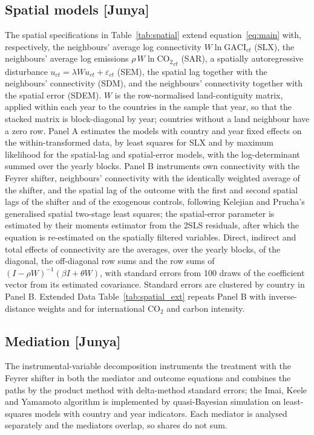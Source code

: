 \documentclass[12pt]{extarticle}
\begin{document}
\subsection*{Spatial models [Junya]}
The spatial specifications in Table~\ref{tab:spatial} extend
equation~\ref{eq:main} with, respectively, the neighbours' average log
connectivity $W \ln \mathrm{GACI}_{ct}$ (SLX), the neighbours' average log
emissions $\rho\, W \ln \mathrm{CO_2}_{ct}$ (SAR), a spatially
autoregressive disturbance $u_{ct} = \lambda W u_{ct} + \varepsilon_{ct}$
(SEM), the spatial lag together with the neighbours' connectivity (SDM),
and the neighbours' connectivity together with the spatial error (SDEM).
$W$ is the row-normalised land-contiguity matrix, applied within each year
to the countries in the sample that year, so that the stacked matrix is
block-diagonal by year; countries without a land neighbour have a zero row.
Panel A estimates the models with country and year fixed effects on the
within-transformed data, by least squares for SLX and by maximum
likelihood for the spatial-lag and spatial-error models, with the
log-determinant summed over the yearly blocks. Panel B instruments own
connectivity with the Feyrer shifter, neighbours' connectivity with the
identically weighted average of the shifter, and the spatial lag of the
outcome with the first and second spatial lags of the shifter and of the
exogenous controls, following Kelejian and Prucha's generalised spatial
two-stage least squares; the spatial-error parameter is estimated by their
moments estimator from the 2SLS residuals, after which the equation is
re-estimated on the spatially filtered variables. Direct, indirect and
total effects of connectivity are the averages, over the yearly blocks, of
the diagonal, the off-diagonal row sums and the row sums of $(I-\rho
W)^{-1}(\beta I + \theta W)$, with standard errors from 100 draws of the
coefficient vector from its estimated covariance. Standard errors are
clustered by country in Panel B. Extended Data
Table~\ref{tab:spatial_ext} repeats Panel B with inverse-distance weights
and for international CO$_2$ and carbon intensity.

\subsection*{Mediation [Junya]}
The instrumental-variable decomposition instruments the treatment with the
Feyrer shifter in both the mediator and outcome equations and combines the
paths by the product method with delta-method standard errors; the Imai,
Keele and Yamamoto algorithm is implemented by quasi-Bayesian simulation on
least-squares models with country and year indicators. Each mediator is
analysed separately and the mediators overlap, so shares do not sum.
\end{document}
